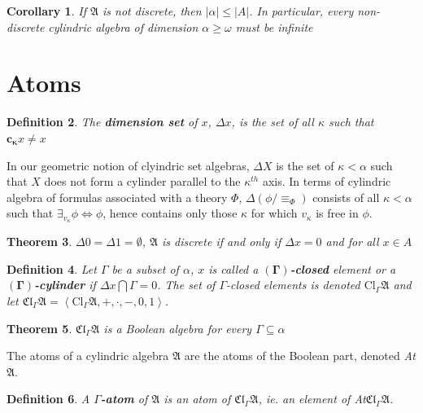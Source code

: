 \documentclass[12pt,a4paper]{article}
\newtheorem{theorem}{Theorem}[section]
\newtheorem{corollary}[theorem]{Corollary}
\newtheorem{definition}[theorem]{Definition}
\begin{document}
\begin{corollary}
If $\mathfrak{A}$ is not discrete, then $|\alpha|\le |A|$. In particular, every non-discrete cylindric algebra of dimension $\alpha\ge \omega$ must be infinite
\end{corollary}

\section{Atoms}
\begin{definition}
The \textbf{dimension set} of $x$, $\Delta x$, is the set of all $\kappa$ such that $\mathbf{c_\kappa}x\neq x$
\end{definition}

In our geometric notion of clyindric set algebras, $\Delta X$ is the set of $\kappa<\alpha$ such that $X$ does not form a cylinder parallel to the $\kappa^{th}$ axis.
In terms of cylindric algebra of formulas associated with a theory $\Phi$, $\Delta(\phi/\equiv_\Phi)$ consists of all $\kappa<\alpha$ such that $\exists_{v_\kappa}\phi\iff\phi$, hence contains only those $\kappa$ for which $v_\kappa$ is free in $
\phi$.

\begin{theorem}
$\Delta 0=\Delta 1=\emptyset$, $\mathfrak{A}$ is discrete if and only if $\Delta x=0$ and for all $x\in A$
\end{theorem}

\begin{definition}
Let $\Gamma$ be a subset of $\alpha$, $x$ is called a $\mathbf{(\Gamma)}$\textbf{-closed} element or a $\mathbf{(\Gamma)}$\textbf{-cylinder} if $\Delta x\bigcap \Gamma=0$. The set of $\Gamma$-closed elements is denoted $\text{Cl}_\Gamma\mathfrak{A}$ and let $\mathfrak{Cl}_\Gamma\mathfrak{A}=\left<\text{Cl}_\Gamma\mathfrak{A},+,\cdot,-,0,1\right>$.
\end{definition}

\begin{theorem}
$\mathfrak{Cl}_\Gamma\mathfrak{A}$ is a Boolean algebra for every $\Gamma\subseteq\alpha$
\end{theorem}

The atoms of a cylindric algebra $\mathfrak{A}$ are the atoms of the Boolean part, denoted \textit{At}$\mathfrak{A}$.
\begin{definition}
A $\Gamma$\textbf{-atom} of $\mathfrak{A}$ is an atom of $\mathfrak{Cl}_\Gamma\mathfrak{A}$, ie. an element of \textit{At}$\mathfrak{Cl}_\Gamma\mathfrak{A}$.
\end{definition}
\end{document}
